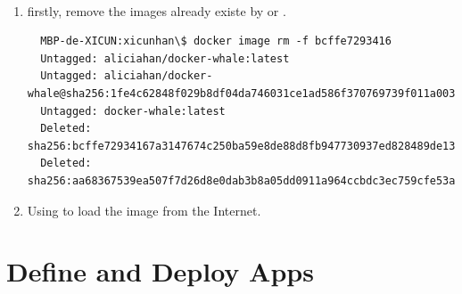 \documentclass[12pt,a4paper]{article}
\begin{document}
\textbf{{\color{brown}{To Pull an Image:}}}\\

\begin{enumerate}
  \item firstly, remove the images already existe by \textit{{\color{violet}{docker rmi -f $<ID>$}}} or \textit{{\color{violet}{docker image rm -f $<ID>$}}}. \\

  \begin{verbatim}
  MBP-de-XICUN:xicunhan\$ docker image rm -f bcffe7293416
  Untagged: aliciahan/docker-whale:latest
  Untagged: aliciahan/docker-whale@sha256:1fe4c62848f029b8df04da746031ce1ad586f370769739f011a0035bed036e2f
  Untagged: docker-whale:latest
  Deleted: sha256:bcffe72934167a3147674c250ba59e8de88d8fb947730937ed828489de132677
  Deleted: sha256:aa68367539ea507f7d26d8e0dab3b8a05dd0911a964ccbdc3ec759cfe53a001f
  \end{verbatim}
  \FloatBarrier

  \item Using \textit{{\color{violet}{Docker run [nameSpace]/[nameRepository]}}} to load the image from the Internet.\\


\end{enumerate}



\section{Define and Deploy Apps}



%
%
\end{document}
